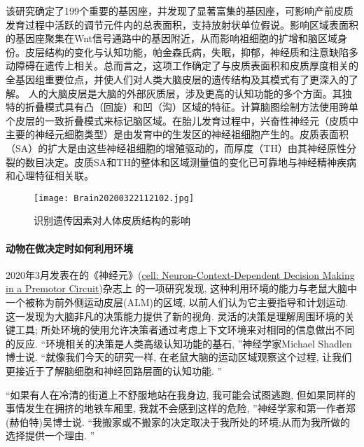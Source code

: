 \begin{itemize}
该研究确定了199个重要的基因座，并发现了显著富集的基因座，可影响产前皮质发育过程中活跃的调节元件内的总表面积，支持放射状单位假说。影响区域表面积的基因座聚集在Wnt信号通路中的基因附近，从而影响祖细胞的扩增和脑区域身份。皮层结构的变化与认知功能，帕金森氏病，失眠，抑郁，神经质和注意缺陷多动障碍在遗传上相关。总而言之，这项工作确定了与皮质表面积和皮质厚度相关的全基因组重要位点，并使人们对人类大脑皮层的遗传结构及其模式有了更深入的了解。
人的大脑皮层是大脑的外部灰质层，涉及更高的认知功能的多个方面。其独特的折叠模式具有凸（回旋）和凹（沟）区域的特征。计算脑图绘制方法使用跨单个皮层的一致折叠模式来标记脑区域。在胎儿发育过程中，兴奋性神经元（皮质中主要的神经元细胞类型）是由发育中的生发区的神经祖细胞产生的。皮质表面积（SA）的扩大是由这些神经祖细胞的增殖驱动的，而厚度（TH）由其神经原性分裂的数目决定。皮质SA和TH的整体和区域测量值的变化已可靠地与神经精神疾病和心理特征相关联。
\begin{figure}[H]
    \begin{center}\quad
    \texttt{[image: Brain20200322112102.jpg]}
    \end{center}
    \caption{识别遗传因素对人体皮质结构的影响}
    \label{Brain20200322112102}
\end{figure}


\paragraph{动物在做决定时如何利用环境}
2020年3月发表在的《神经元》(\href{https://www.cell.com/neuron/fulltext/S0896-6273(20)30061-1}{cell: Neuron-Context-Dependent Decision Making in a Premotor Circuit})杂志上 的一项研究发现, 这种利用环境的能力与老鼠大脑中一个被称为前外侧运动皮层(ALM)的区域, 以前人们认为它主要指导和计划运动. 
这一发现为大脑非凡的决策能力提供了新的视角.
灵活的决策是理解周围环境的关键工具; 所处环境的使用允许决策者通过考虑上下文环境来对相同的信息做出不同的反应.
“环境相关的决策是人类高级认知功能的基石, ”神经学家Michael Shadlen博士说. “就像我们今天的研究一样, 在老鼠大脑的运动区域观察这个过程, 让我们更接近于了解脑细胞和神经回路层面的认知功能. ”

\begin{newexam}
  “如果有人在冷清的街道上不舒服地站在我身边, 我可能会试图逃跑, 但如果同样的事情发生在拥挤的地铁车厢里, 我就不会感到这样的危险, ”神经学家和第一作者郑(赫伯特)吴博士说. “我搬家或不搬家的决定取决于我所处的环境;从而为我所做的选择提供一个理由. ”
\end{newexam}


\end{itemize}

